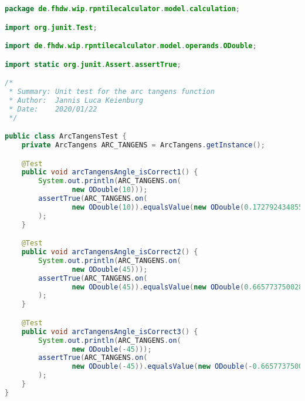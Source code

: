 \begin{lstlisting}[caption=ArcTangensTest (Keienburg),label=list:ArcTangensTest,language=Java]
package de.fhdw.wip.rpntilecalculator.model.calculation;

import org.junit.Test;

import de.fhdw.wip.rpntilecalculator.model.operands.ODouble;

import static org.junit.Assert.assertTrue;

/*
 * Summary: Unit test for the arc tangens function
 * Author:  Jannis Luca Keienburg
 * Date:    2020/01/22
 */

public class ArcTangensTest {
    private ArcTangens ARC_TANGENS = ArcTangens.getInstance();

    @Test
    public void arcTangensAngle_isCorrect1() {
        System.out.println(ARC_TANGENS.on(
                new ODouble(10)));
        assertTrue(ARC_TANGENS.on(
                new ODouble(10)).equalsValue(new ODouble(0.1727924348551592))
        );
    }

    @Test
    public void arcTangensAngle_isCorrect2() {
        System.out.println(ARC_TANGENS.on(
                new ODouble(45)));
        assertTrue(ARC_TANGENS.on(
                new ODouble(45)).equalsValue(new ODouble(0.6657737500283538))
        );
    }

    @Test
    public void arcTangensAngle_isCorrect3() {
        System.out.println(ARC_TANGENS.on(
                new ODouble(-45)));
        assertTrue(ARC_TANGENS.on(
                new ODouble(-45)).equalsValue(new ODouble(-0.6657737500283538))
        );
    }
}
\end{lstlisting} 

